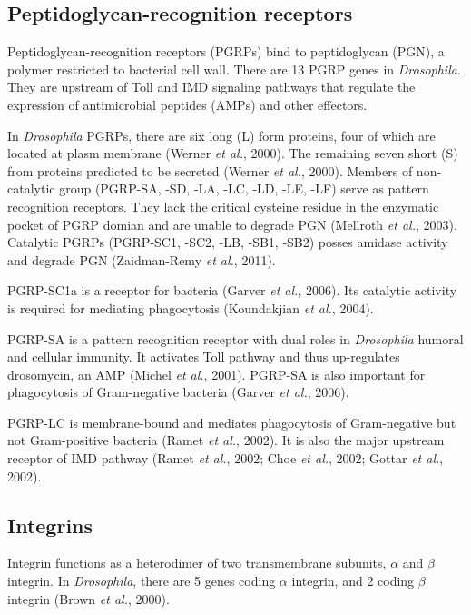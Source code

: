 \documentclass[11pt]{article}
\begin{document}
\subsection{Peptidoglycan-recognition receptors}
Peptidoglycan-recognition receptors (PGRPs) bind to peptidoglycan (PGN), a polymer restricted to bacterial cell wall. 
There are 13 PGRP genes in \textit{Drosophila}. 
They are upstream of Toll and IMD signaling pathways that regulate the expression of antimicrobial peptides (AMPs) and other effectors. 

\newline

In \textit{Drosophila} PGRPs, there are six long (L) form proteins, four of which are located at plasm membrane (Werner \textit{et al.}, 2000). 
The remaining seven short (S) from proteins predicted to be secreted (Werner \textit{et al.}, 2000). 
Members of non-catalytic group (PGRP-SA, -SD, -LA, -LC, -LD, -LE, -LF) serve as pattern recognition receptors. 
They lack the critical cysteine residue in the enzymatic pocket of PGRP domian and are unable to degrade PGN (Mellroth \textit{et al.}, 2003). 
Catalytic PGRPs (PGRP-SC1, -SC2, -LB, -SB1, -SB2) posses amidase activity and degrade PGN (Zaidman-Remy \textit{et al.}, 2011).

\newline

PGRP-SC1a is a receptor for bacteria (Garver \textit{et al.}, 2006). 
Its catalytic activity is required for mediating phagocytosis (Koundakjian \textit{et al.}, 2004). 

\newline

PGRP-SA is a pattern recognition receptor with dual roles in \textit{Drosophila} humoral and cellular immunity. 
It activates Toll pathway and thus up-regulates drosomycin, an AMP (Michel \textit{et al.}, 2001). 
PGRP-SA is also important for phagocytosis of Gram-negative bacteria (Garver \textit{et al.}, 2006).

\newline

PGRP-LC is membrane-bound and mediates phagocytosis of Gram-negative but not Gram-positive bacteria (Ramet \textit{et al.}, 2002). 
It is also the major upstream receptor of IMD pathway (Ramet \textit{et al.}, 2002; Choe \textit{et al.}, 2002; Gottar \textit{et al.}, 2002).

\subsection{Integrins}
Integrin functions as a heterodimer of two transmembrane subunits, $\alpha$ and $\beta$ integrin. 
In \textit{Drosophila}, there are 5 genes coding $\alpha$ integrin, and 2 coding $\beta$ integrin (Brown \textit{et al.}, 2000). 
\end{document}
